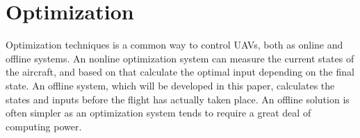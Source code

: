 \section{Optimization}

Optimization techniques is a common way to control UAVs, both as online and offline systems. An nonline optimization system can measure the current states of the aircraft, and based on that calculate the optimal input depending on the final state. An offline system, which will be developed in this paper, calculates the states and inputs before the flight has actually taken place. An offline solution is often simpler as an optimization system tends to require a great deal of computing power.